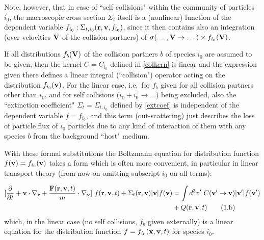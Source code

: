 Note, however, that in case of ``self collisions" within the community of
particles $i_0$, the macroscopic cross section $\Sigma_t$ itself is a
(nonlinear) function of the dependent variable $f_{i_0}:
  \Sigma_{t,i_0}
  (\mathbf{r},\mathbf{v},f_{i_0})$, since it then contains also an integration (over velocities
$\mathbf{V}$ of the collision partners) of $\sigma(\dots, \mathbf{V} \rightarrow \dots)
  \times f_{i_0}(\mathbf{V})$.


\vspace{1em}

If all distributions $f_b(\mathbf{V})$ of  the collision partners $b$ of species $i_0$
are assumed to be given, then the kernel $C = C_{i_0}$ defined in
\cref{colkern} is linear and the expression given there defines  a linear
integral (``collision") operator acting on the distribution $f_{i_0}(\mathbf{v})$.
For the linear case, i.e.\ for $f_b$ given for all collision partners other
than $i_0$, and for self collisions ($i_0 + i_0 \rightarrow \dots$) being
excluded, also the ``extinction coefficient" $\Sigma_t = \Sigma_{t,i_0}$
defined by \cref{extcoef} is independent of the dependent variable $f =
  f_{i_0}$, and this term (out-scattering) just describes the loss of particle
flux of $i_0$ particles due to any kind of interaction of them with any species
$b$ from the background ``host" medium.

With these formal substitutions the Boltzmann equation for distribution
function $f(\mathbf{v}) = f_{i_0}(\mathbf{v})$ takes a form which is often more convenient,
in particular in linear transport theory (from now on omitting subscript $i_0$
on all terms):

\begin{align}
  \label{eq1b}
  \lbrack\frac\partial{\partial t} + \mathbf{v} \cdot
  \nabla_{\mathbf{r}} +
  \frac{\mathbf{F}(\mathbf{r},\mathbf{v},t)}{m} \cdot
  \nabla_{\mathbf{v}}\rbrack \ f(\mathbf{r},\mathbf{v},t) +
  \Sigma_t(\mathbf{r},\mathbf{v}) |\mathbf{v}|
  f(\mathbf{v})
   & =
  \int d^3{v}' \ C(\mathbf{v}' \rightarrow \mathbf{v})
  |\mathbf{v}'|
  f(\mathbf{v}') \nonumber           \\
   & + Q(\mathbf{r},\mathbf{v},t) \tag{1.b}
\end{align}
which, in the linear case (no self collisions, $f_b$ given externally) is a
linear equation for the distribution
function $f = f_{i_0}
  (\mathbf{x},\mathbf{v},t)$ for species $i_0$.

